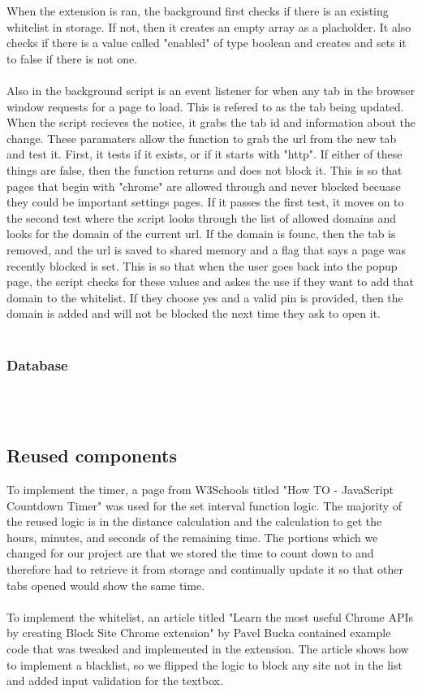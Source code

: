 \documentclass[12pt]{article}
\begin{document}
When the extension is ran, the background first checks if there is an existing whitelist in storage. If not, then it creates an empty array as a placholder. 
It also checks if there is a value called "enabled" of type boolean and creates and sets it to false if there is not one. 
\\\\Also in the background script is an event listener for when any tab in the browser window requests for a page to load. This is refered to as the tab being updated. 
When the script recieves the notice, it grabs the tab id and information about the change. These paramaters allow the function 
to grab the url from the new tab and test it. First, it tests if it exists, or if it starts with "http". If either of these things are false, then the function returns and does not block it. 
This is so that pages that begin with "chrome" are allowed through and never blocked becuase they could be important settings pages. 
If it passes the first test, it moves on to the second test where the script looks through the list of allowed domains and looks for the domain of the current url. If the domain is founc, then the tab is removed, and the url is saved to shared memory and a flag that says a page was recently blocked is set. 
This is so that when the user goes back into the popup page, the script checks for these values and askes the use if they want to add that domain to the whitelist. If they choose yes and a valid pin is provided, then the domain 
is added and will not be blocked the next time they ask to open it.
\\\\
\subsubsection{Database}


\\\\
\subsection{Reused components}
To implement the timer, a page from W3Schools titled "How TO - JavaScript Countdown Timer" was used for the set interval function logic. 
The majority of the reused logic is in the distance calculation and the calculation to get the hours, minutes, and seconds of the remaining time. 
The portions which we changed for our project are that we stored the time to count down to and therefore had to retrieve it from storage 
and continually update it so that other tabs opened would show the same time. 
\\\\
To implement the whitelist, an article titled "Learn the most useful Chrome APIs by 
creating Block Site Chrome extension" by Pavel Bucka contained example code that was 
tweaked and implemented in the extension. The article shows how to implement a blacklist, 
so we flipped the logic to block any site not in the list and added input validation for the textbox. 
\\\\
\end{document}
